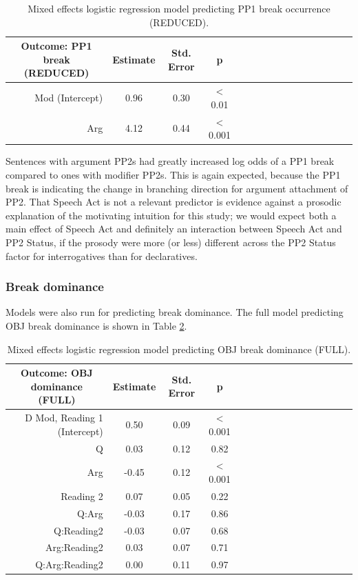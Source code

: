 \documentclass[12pt,oneside]{book}
\begin{document}
\begin{table}[!h]

\caption{\label{tab:pp1Mod}Mixed effects logistic regression model predicting PP1 break occurrence (REDUCED).}
\centering
\begin{tabular}{rcccrcccrcccrccc}
\toprule
\multicolumn{1}{c}{Outcome: PP1 break (REDUCED)} & \multicolumn{1}{c}{Estimate} & \multicolumn{1}{c}{Std. Error} & \multicolumn{1}{c}{p}\\
\midrule
Mod (Intercept) & 0.96 & 0.30 & < 0.01\\
Arg & 4.12 & 0.44 & < 0.001\\
\bottomrule
\end{tabular}
\end{table}

Sentences with argument PP2s had greatly increased log odds of a PP1 break compared to ones with modifier PP2s. This is again expected, because the PP1 break is indicating the change in branching direction for argument attachment of PP2. That Speech Act is not a relevant predictor is evidence against a prosodic explanation of the motivating intuition for this study; we would expect both a main effect of Speech Act and definitely an interaction between Speech Act and PP2 Status, if the prosody were more (or less) different across the PP2 Status factor for interrogatives than for declaratives.

\hypertarget{bdomReg}{%
\subsubsection{Break dominance}\label{bdomReg}}

Models were also run for predicting break dominance. The full model predicting OBJ break dominance is shown in Table \ref{tab:fodom}.

\begin{table}[!h]

\caption{\label{tab:fodom}Mixed effects logistic regression model predicting OBJ break dominance (FULL).}
\centering
\begin{tabular}{rcccrcccrcccrccc}
\toprule
\multicolumn{1}{c}{Outcome: OBJ dominance (FULL)} & \multicolumn{1}{c}{Estimate} & \multicolumn{1}{c}{Std. Error} & \multicolumn{1}{c}{p}\\
\midrule
D Mod, Reading 1 (Intercept) & 0.50 & 0.09 & < 0.001\\
Q & 0.03 & 0.12 & 0.82\\
Arg & -0.45 & 0.12 & < 0.001\\
Reading 2 & 0.07 & 0.05 & 0.22\\
Q:Arg & -0.03 & 0.17 & 0.86\\
\addlinespace
Q:Reading2 & -0.03 & 0.07 & 0.68\\
Arg:Reading2 & 0.03 & 0.07 & 0.71\\
Q:Arg:Reading2 & 0.00 & 0.11 & 0.97\\
\bottomrule
\end{tabular}
\end{table}
\end{document}
